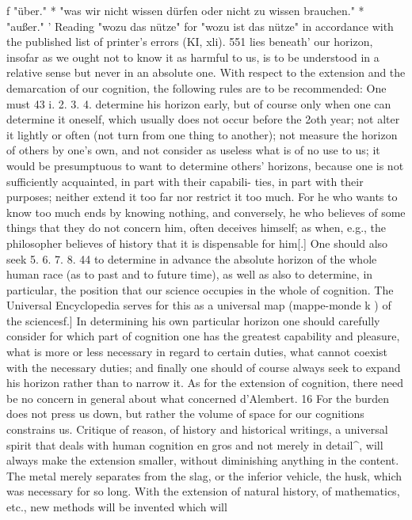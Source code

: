 f
"über."
* "was wir nicht wissen dürfen oder nicht zu wissen brauchen."
* "außer."
'
Reading "wozu das nütze" for "wozu ist das nütze" in accordance with the published list of
printer's errors (KI, xli).
551
lies beneath' our horizon, insofar as we ought not to know it as harmful to
us, is to be understood in a relative sense but never in an absolute one.
With respect to the extension and the demarcation of our cognition, the
following rules are to be recommended:
One must
43
i.
2.
3.
4.
determine his horizon early, but of course only when one can determine it
oneself, which usually does not occur before the 2oth year;
not alter it lightly or often (not turn from one thing to another);
not measure the horizon of others by one's own, and not consider as useless
what is of no use to us; it would be presumptuous to want to determine others'
horizons, because one is not sufficiently acquainted, in part with their capabili-
ties, in part with their purposes;
neither extend it too far nor restrict it too much. For he who wants to know
too much ends by knowing nothing, and conversely, he who believes of some
things that they do not concern him, often deceives himself; as when, e.g., the
philosopher believes of history that it is dispensable for him[.]
One should also seek
5.
6.
7.
8.
44
to determine in advance the absolute horizon of the whole human race (as to
past and to future time), as well as also
to determine, in particular, the position that our science occupies in the whole
of cognition. The Universal Encyclopedia serves for this as a universal map
(mappe-monde k ) of the sciencesf.]
In determining his own particular horizon one should carefully consider for
which part of cognition one has the greatest capability and pleasure, what is
more or less necessary in regard to certain duties, what cannot coexist with
the necessary duties; and finally
one should of course always seek to expand his horizon rather than to narrow
it.
As for the extension of cognition, there need be no concern in general
about what concerned d'Alembert. 16 For the burden does not press us
down, but rather the volume of space for our cognitions constrains us.
Critique of reason, of history and historical writings, a universal spirit that
deals with human cognition en gros and not merely in detail^, will always
make the extension smaller, without diminishing anything in the content.
The metal merely separates from the slag, or the inferior vehicle, the
husk, which was necessary for so long. With the extension of natural
history, of mathematics, etc., new methods will be invented which will
